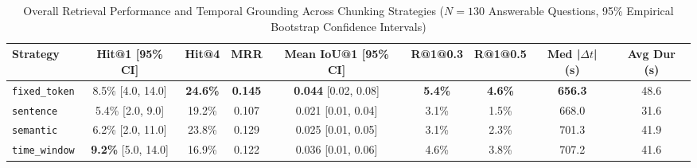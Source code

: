 \begin{table}[t]
\caption{Overall Retrieval Performance and Temporal Grounding Across Chunking Strategies ($N=130$ Answerable Questions, 95\% Empirical Bootstrap Confidence Intervals)}
\label{tab:main_retrieval}
\centering
\begin{tabular}{lcccccccc}
\hline
\textbf{Strategy} & \textbf{Hit@1 [95\% CI]} & \textbf{Hit@4} & \textbf{MRR} & \textbf{Mean IoU@1 [95\% CI]} & \textbf{R@1@0.3} & \textbf{R@1@0.5} & \textbf{Med |$\Delta t$| (s)} & \textbf{Avg Dur (s)} \\
\hline
\texttt{fixed\_token} & 8.5\% [4.0, 14.0] & \textbf{24.6\%} & \textbf{0.145} & \textbf{0.044} [0.02, 0.08] & \textbf{5.4\%} & \textbf{4.6\%} & \textbf{656.3} & 48.6 \\
\texttt{sentence}     & 5.4\% [2.0, 9.0]  & 19.2\%          & 0.107          & 0.021 [0.01, 0.04]          & 3.1\%          & 1.5\%          & 668.0          & 31.6 \\
\texttt{semantic}     & 6.2\% [2.0, 11.0] & 23.8\%          & 0.129          & 0.025 [0.01, 0.05]          & 3.1\%          & 2.3\%          & 701.3          & 41.9 \\
\texttt{time\_window} & \textbf{9.2\%} [5.0, 14.0] & 16.9\%          & 0.122          & 0.036 [0.01, 0.06]          & 4.6\%          & 3.8\%          & 707.2          & 41.6 \\
\hline
\end{tabular}
\end{table}
